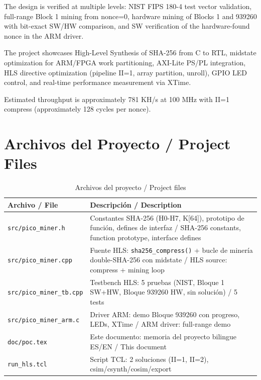 \documentclass[12pt,a4paper]{article}
\newcommand{\es}[1]{\foreignlanguage{spanish}{#1}}
\newcommand{\en}[1]{\foreignlanguage{english}{#1}}
\newcommand{\bsection}[2]{%
    \section{#1 \textnormal{\normalsize\color{accentblue}/ #2}}%
}
\newenvironment{bilingual}{%
    \par\medskip
}{%
    \par\medskip
}
\begin{document}
\begin{bilingual}
{The design is verified at multiple levels: NIST FIPS 180-4 test vector validation,
full-range Block 1 mining from nonce=0, hardware mining of Blocks 1 and 939260 with
bit-exact SW/HW comparison, and SW verification of the hardware-found nonce in the
ARM driver.

The project showcases High-Level Synthesis of SHA-256 from C to RTL, midstate
optimization for ARM/FPGA work partitioning, AXI-Lite PS/PL integration, HLS
directive optimization (pipeline II=1, array partition, unroll), GPIO LED control,
and real-time performance measurement via XTime.

Estimated throughput is approximately 781 KH/s at 100 MHz with II=1 compress
(approximately 128 cycles per nonce).}
\end{bilingual}

\bsection{Archivos del Proyecto}{Project Files}

\begin{table}[h]
    \centering
    \caption{\es{Archivos del proyecto} / \en{Project files}}
    \begin{tabular}{@{}lp{9cm}@{}}
        \toprule
        \textbf{\es{Archivo} / \en{File}} & \textbf{\es{Descripci\'on} / \en{Description}} \\
        \midrule
        \texttt{src/pico\_miner.h}      & Constantes SHA-256 (H0-H7, K[64]), prototipo de funci\'on, defines de interfaz / SHA-256 constants, function prototype, interface defines \\
        \texttt{src/pico\_miner.cpp}    & Fuente HLS: \texttt{sha256\_compress()} + bucle de miner\'ia double-SHA-256 con midstate / HLS source: compress + mining loop \\
        \texttt{src/pico\_miner\_tb.cpp} & Testbench HLS: 5 pruebas (NIST, Bloque 1 SW+HW, Bloque 939260 HW, sin soluci\'on) / 5 tests \\
        \texttt{src/pico\_miner\_arm.c}  & Driver ARM: demo Bloque 939260 con progreso, LEDs, XTime / ARM driver: full-range demo \\
        \texttt{doc/poc.tex}            & Este documento: memoria del proyecto bilingue ES/EN / This document \\
        \texttt{run\_hls.tcl}           & Script TCL: 2 soluciones (II=1, II=2), csim/csynth/cosim/export \\
        \bottomrule
    \end{tabular}
\end{table}

\end{document}

